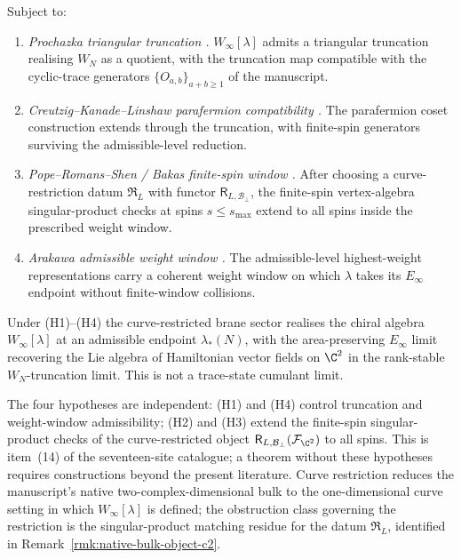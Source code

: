 \begin{conj}
\label{conj:w-infinity-admissible-endpoint}
Subject to:
\begin{enumerate}[label=\textup{(H\arabic*)}]
  \item \emph{Prochazka triangular truncation
        \cite{prochazka-w-infinity}.}
        \(W_\infty[\lambda]\) admits a triangular truncation realising
        \(W_N\) as a quotient, with the truncation map compatible with
        the cyclic-trace generators \(\{O_{a,b}\}_{a+b\geq 1}\) of the
        manuscript.
  \item \emph{Creutzig--Kanade--Linshaw parafermion compatibility
        \cite{creutzig-kanade-linshaw-coset}.}
        The parafermion coset construction extends through the
        truncation, with finite-spin generators surviving the
        admissible-level reduction.
  \item \emph{Pope--Romans--Shen / Bakas finite-spin window
        \cites{pope-romans-shen}{bakas-w-infinity}.}
        After choosing a curve-restriction datum
        \(\mathfrak R_L\) with functor
        \(\mathsf R_{L,\mathcal B_\perp}\), the finite-spin
        vertex-algebra singular-product checks at spins
        \(s\leq s_{\max}\) extend to all spins inside the prescribed
        weight window.
  \item \emph{Arakawa admissible weight window
        \cite{arakawa-admissible-w}.}
        The admissible-level highest-weight representations carry a
        coherent weight window on which \(\lambda\) takes its
        \(E_\infty\) endpoint without finite-window collisions.
\end{enumerate}
Under (H1)--(H4) the curve-restricted brane sector realises the chiral
algebra \(W_\infty[\lambda]\) at an admissible endpoint
\(\lambda_*(N)\), with the area-preserving \(E_\infty\) limit recovering
the Lie algebra of Hamiltonian vector fields on \(\C^2\) in the
rank-stable \(W_N\)-truncation limit.  This is not a trace-state
cumulant limit.
\end{conj}

The four hypotheses are independent: (H1) and (H4) control truncation
and weight-window admissibility; (H2) and (H3) extend the finite-spin
singular-product checks of the curve-restricted object
\(\mathsf R_{L,\mathcal B_\perp}(\mathcal F_{\C^2})\) to all spins.
This is item~(14) of the
seventeen-site catalogue; a theorem without these hypotheses requires
constructions beyond the present literature.  Curve restriction reduces
the manuscript's native two-complex-dimensional bulk to the
one-dimensional curve setting in which \(W_\infty[\lambda]\) is defined;
the obstruction class governing the restriction is the singular-product
matching residue for the datum \(\mathfrak R_L\), identified in
Remark~\ref{rmk:native-bulk-object-c2}.

